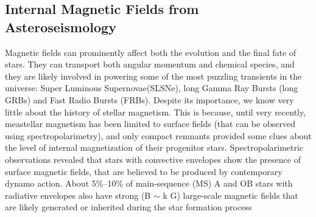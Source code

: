 {\color{red}\subsection{Internal Magnetic Fields from Asteroseismology}}
Magnetic fields can prominently affect both the evolution and the final fate of stars. They can transport both angular momentum and chemical species, and they are likely involved in powering some of the most puzzling transients in the universe: Super Luminous Supernovae(SLSNe), long Gamma Ray Bursts (long GRBs) and Fast Radio Bursts (FRBs). Despite its importance, we know very little about the history of stellar magnetism. This is  because, until very recently, meastellar magnetism has been limited to surface fields (that can be observed using spectropolarimetry), and only compact remnants provided some clues about the level of internal magnetization of their progenitor stars. Spectropolarimetric observations revealed that stars with convective envelopes show the presence of surface magnetic fields, that are believed to be produced by contemporary dynamo action. About 5\%–10\% of main-sequence (MS) A and OB stars with radiative envelopes also have strong (B $\sim$ k G) large-scale magnetic fields that are likely generated or inherited during the star formation process  \citep[fossil fields, see e.g.,][]{2012ASPC..464..405W}